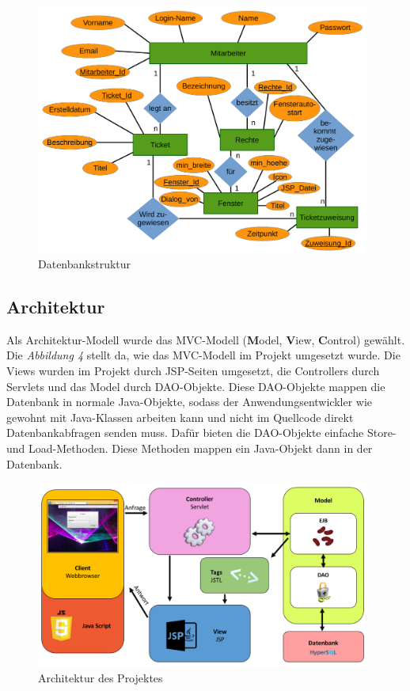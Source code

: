 \documentclass[12pt, a4paper]{article}
\begin{document}
\begin{figure}[H]
	\begin{center}
		\includegraphics[width=110mm]{Bilder/erd.pdf}
	\end{center}
	\caption{Datenbankstruktur}
\end{figure}

\subsection{Architektur}
Als Architektur-Modell wurde das MVC-Modell (\textbf{M}odel, \textbf{V}iew, \textbf{C}ontrol) gewählt. Die \textit{Abbildung 4} stellt da, wie das MVC-Modell im Projekt umgesetzt wurde. Die \glqq Views\grqq{} wurden im Projekt durch JSP-Seiten umgesetzt, die \glqq Controllers\grqq{} durch Servlets und das \glqq Model\grqq{} durch DAO-Objekte. Diese DAO-Objekte mappen die Datenbank in normale Java-Objekte, sodass der Anwendungsentwickler wie gewohnt mit Java-Klassen arbeiten kann und nicht im Quellcode direkt Datenbankabfragen senden muss. Dafür bieten die DAO-Objekte einfache \glqq Store\grqq{}- und \glqq Load\grqq{}-Methoden. Diese Methoden mappen ein Java-Objekt dann in der Datenbank. 
\begin{figure}[H]
	\begin{center}
		\includegraphics[width=110mm]{Bilder/archDiagramm.png}
	\end{center}
	\caption{Architektur des Projektes}
\end{figure}
\end{document}
